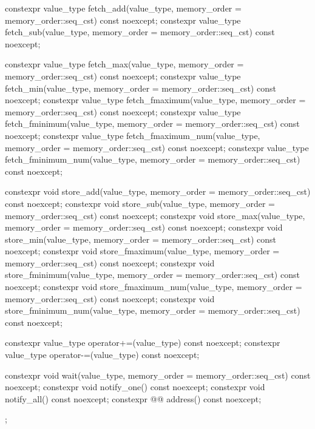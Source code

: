 \begin{codeblock}
{{    constexpr value_type fetch_add(value_type,
                                   memory_order = memory_order::seq_cst) const noexcept;
    constexpr value_type fetch_sub(value_type,
                                   memory_order = memory_order::seq_cst) const noexcept;

    constexpr value_type fetch_max(value_type,
                                   memory_order = memory_order::seq_cst) const noexcept;
    constexpr value_type fetch_min(value_type,
                                   memory_order = memory_order::seq_cst) const noexcept;
    constexpr value_type fetch_fmaximum(value_type,
                                        memory_order = memory_order::seq_cst) const noexcept;
    constexpr value_type fetch_fminimum(value_type,
                                        memory_order = memory_order::seq_cst) const noexcept;
    constexpr value_type fetch_fmaximum_num(value_type,
                                            memory_order = memory_order::seq_cst) const noexcept;
    constexpr value_type fetch_fminimum_num(value_type,
                                            memory_order = memory_order::seq_cst) const noexcept;

    constexpr void store_add(value_type, memory_order = memory_order::seq_cst) const noexcept;
    constexpr void store_sub(value_type, memory_order = memory_order::seq_cst) const noexcept;
    constexpr void store_max(value_type, memory_order = memory_order::seq_cst) const noexcept;
    constexpr void store_min(value_type, memory_order = memory_order::seq_cst) const noexcept;
    constexpr void store_fmaximum(value_type,
                                  memory_order = memory_order::seq_cst) const noexcept;
    constexpr void store_fminimum(value_type,
                                  memory_order = memory_order::seq_cst) const noexcept;
    constexpr void store_fmaximum_num(value_type,
                                      memory_order = memory_order::seq_cst) const noexcept;
    constexpr void store_fminimum_num(value_type,
                                      memory_order = memory_order::seq_cst) const noexcept;

    constexpr value_type operator+=(value_type) const noexcept;
    constexpr value_type operator-=(value_type) const noexcept;

    constexpr void wait(value_type,
                        memory_order = memory_order::seq_cst) const noexcept;
    constexpr void notify_one() const noexcept;
    constexpr void notify_all() const noexcept;
    constexpr @@ address() const noexcept;
  };
}
\end{codeblock}

